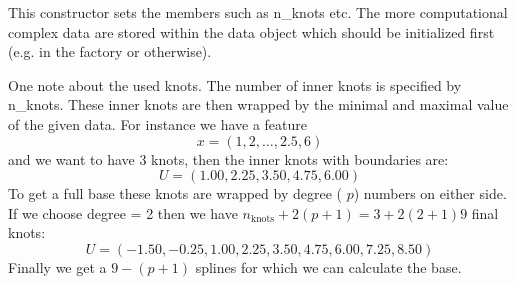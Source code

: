 This constructor sets the members such as n\+\_\+knots etc. The more computational complex data are stored within the data object which should be initialized first (e.\+g. in the factory or otherwise).

One note about the used knots. The number of inner knots is specified by {\ttfamily n\+\_\+knots}. These inner knots are then wrapped by the minimal and maximal value of the given data. For instance we have a feature \[ x = (1, 2, \dots, 2.5, 6) \] and we want to have 3 knots, then the inner knots with boundaries are\+: \[ U = (1.00, 2.25, 3.50, 4.75, 6.00) \] To get a full base these knots are wrapped by {\ttfamily degree} ( $p$) numbers on either side. If we choose {\ttfamily degree = 2} then we have $n_\mathrm{knots} + 2(p + 1) = 3 + 2(2 + 1) 9$ final knots\+: \[ U = (-1.50, -0.25, 1.00, 2.25, 3.50, 4.75, 6.00, 7.25, 8.50) \] Finally we get a $9 - (p + 1)$ splines for which we can calculate the base. ~\newline
 
